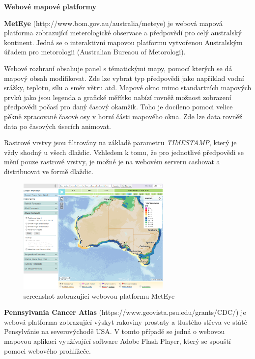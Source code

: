 \bigskip
\noindent
\textbf{Webové mapové platformy}

\textbf{MetEye} (http://www.bom.gov.au/australia/meteye) je webová mapová platforma zobrazující meterologické observace a předpovědí pro celý australský kontinent. Jedná se o interaktivní mapovou platformu vytvořenou Australským úřadem pro metorologii (Australian Bureaou of Metorologi).

Webové rozhraní obsahuje panel s tématickými mapy, pomocí kterých se dá mapový obsah modifikovat. Zde lze vybrat typ předpovědi jako například vodní srážky, teplotu, sílu a směr větru atd. Mapové okno mimo standartních mapových prvků jako jsou legenda a grafické měřítko nabízí rovněž možnost zobrazení předpovědi počasí pro daný časový okamžik. Toho je docíleno pomoci velice pěkně zpracované časové osy v horní části mapového okna. Zde lze data rovněž data po časových úsecích animovat.

Rastrové vrstvy jsou filtrovány na základě parametru \textit{TIMESTAMP}, který je vždy shodný u všech dlaždic. Vzhledem k tomu, že pro jednotlivé předpovědi se mění pouze rastrové vrstvy, je možné je na webovém serveru cashovat a distribuovat ve formě dlaždic. 

\begin{figure}[h!]
	\centering
	\includegraphics[width=0.67\textwidth]{../img/meteye.png}
	\caption{screenshot zobrazující webovou platformu MetEye}
	\label{fig:gay-sands}
\end{figure}

\textbf{Pennsylvania Cancer Atlas} (https://www.geovista.psu.edu/grants/CDC/) je webová platforma zobrazující výskyt rakoviny prostaty a tlustého střeva ve státě Pensylvánie na severovýchodě USA. V tomto případě se jedná o webovou mapovou aplikaci využívající software Adobe Flash Player, který se spouští pomoci webového prohlížeče. 

